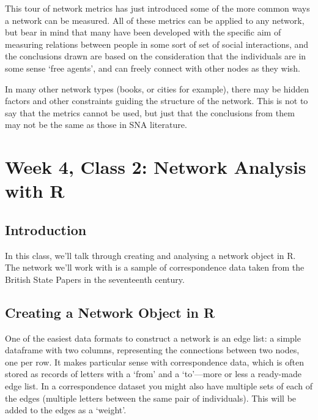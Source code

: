 \documentclass[
]{book}
\begin{document}
This tour of network metrics has just introduced some of the more common ways a network can be measured. All of these metrics can be applied to any network, but bear in mind that many have been developed with the specific aim of measuring relations between people in some sort of set of social interactions, and the conclusions drawn are based on the consideration that the individuals are in some sense `free agents', and can freely connect with other nodes as they wish.

In many other network types (books, or cities for example), there may be hidden factors and other constraints guiding the structure of the network. This is not to say that the metrics cannot be used, but just that the conclusions from them may not be the same as those in SNA literature.

\hypertarget{week-4-class-2-network-analysis-with-r}{%
\chapter{Week 4, Class 2: Network Analysis with R}\label{week-4-class-2-network-analysis-with-r}}

\hypertarget{introduction-2}{%
\section{Introduction}\label{introduction-2}}

In this class, we'll talk through creating and analysing a network object in R. The network we'll work with is a sample of correspondence data taken from the British State Papers in the seventeenth century.

\hypertarget{creating-a-network-object-in-r}{%
\section{Creating a Network Object in R}\label{creating-a-network-object-in-r}}

One of the easiest data formats to construct a network is an edge list: a simple dataframe with two columns, representing the connections between two nodes, one per row. It makes particular sense with correspondence data, which is often stored as records of letters with a `from' and a `to'---more or less a ready-made edge list. In a correspondence dataset you might also have multiple sets of each of the edges (multiple letters between the same pair of individuals). This will be added to the edges as a `weight'.
\end{document}

